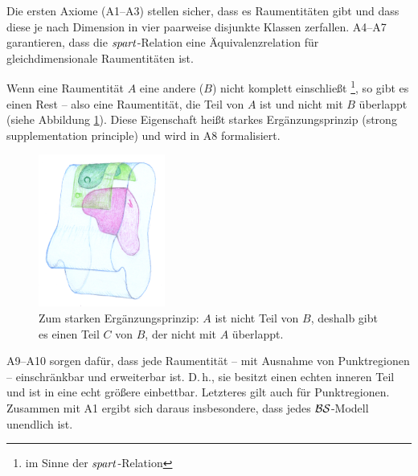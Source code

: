 Die
ersten Axiome (A1--A3) stellen sicher, dass es Raumentitäten gibt und dass diese je nach Dimension in vier paarweise disjunkte Klassen zerfallen.
A4--A7
garantieren, dass die $\mathit{spart}$-Relation eine Äquivalenzrelation für gleichdimensionale Raumentitäten ist.


Wenn
eine Raumentität $A$ eine andere ($B$) nicht komplett einschließt%
\footnote{im Sinne der $\mathit{spart}$-Relation},
so gibt es einen Rest -- also eine Raumentität, die Teil von $A$ ist und nicht mit $B$ überlappt (siehe Abbildung \ref{fig:supplementation}).
Diese Eigenschaft heißt starkes Ergänzungsprinzip (strong supplementation principle) und wird in A8 formalisiert.

\begin{figure}[ht]
    \centering
    \includegraphics[height=5cm]{abb/supplementation.png}
    \caption[Zum starken Ergänzungsprinzip]{Zum starken Ergänzungsprinzip: $A$ ist nicht Teil von $B$, deshalb gibt es einen Teil $C$ von $B$, der nicht mit $A$ überlappt.}
    \label{fig:supplementation}
\end{figure}



A9--A10
sorgen dafür, dass jede Raumentität -- mit Ausnahme von Punktregionen -- einschränkbar und erweiterbar ist. D.\,h., sie besitzt einen echten inneren Teil und ist in eine echt größere einbettbar. Letzteres gilt auch für Punktregionen.
Zusammen mit A1 ergibt sich daraus insbesondere, dass jedes $\mathcal{BS}$-Modell unendlich ist.


